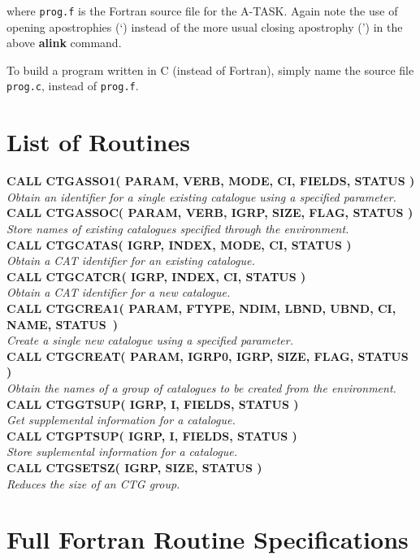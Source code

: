\documentclass[twoside,11pt]{article}
\renewcommand{\_}{\texttt{\symbol{95}}}
\newcommand{\noteroutine}[2]{{\small \bf #1} \\
                              \hspace*{3em} {\em #2} \\[1.5ex]}
\newcommand{\noteroutine}[2]{
      \begin{description}
         \item [{\bf {#1}}] {\em #2}
      \end{description}
   }
\begin{document}
where {\tt prog.f} is the Fortran source file for the A-TASK. Again
note the use of opening apostrophies (`) instead of the more usual
closing apostrophy (') in the above {\bf alink} command.

To build a program written in C (instead of Fortran), simply name the
source file {\tt prog.c}, instead of {\tt prog.f}.

\appendix

\section{List of Routines}

\noteroutine{CALL CTG\_ASSO1( PARAM, VERB, MODE, CI, FIELDS, STATUS )}
   {Obtain an identifier for a single existing catalogue using a specified parameter.}
\noteroutine{CALL CTG\_ASSOC( PARAM, VERB, IGRP, SIZE, FLAG, STATUS )}
   {Store names of existing catalogues specified through the environment.}
\noteroutine{CALL CTG\_CATAS( IGRP, INDEX, MODE, CI, STATUS )}
   {Obtain a CAT identifier for an existing catalogue.}
\noteroutine{CALL CTG\_CATCR( IGRP, INDEX, CI, STATUS )}
   {Obtain a CAT identifier for a new catalogue.}
\noteroutine{CALL CTG\_CREA1( PARAM, FTYPE, NDIM, LBND, UBND, CI, NAME, STATUS~)}
   {Create a single new catalogue using a specified parameter.}
\noteroutine{CALL CTG\_CREAT( PARAM, IGRP0, IGRP, SIZE, FLAG, STATUS )}
   {Obtain the names of a group of catalogues to be created from the environment.}
\noteroutine{CALL CTG\_GTSUP( IGRP, I, FIELDS, STATUS )}
   {Get supplemental information for a catalogue.}
\noteroutine{CALL CTG\_PTSUP( IGRP, I, FIELDS, STATUS )}
   {Store suplemental information for a catalogue.}
\noteroutine{CALL CTG\_SETSZ( IGRP, SIZE, STATUS )}
   {Reduces the size of an CTG group.}

\section{Full Fortran Routine Specifications}
\label {SEC:FULLSPEC}

\small
\end{document}
